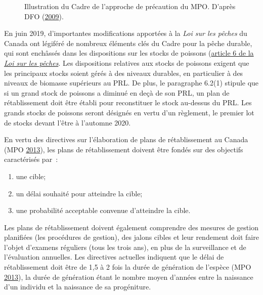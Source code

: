 \documentclass[french,11pt]{book}
\begin{document}
\begin{figure}[htb]

{\centering {} 

}

\caption{Illustration du Cadre de l'approche de précaution du MPO. D'après DFO (\protect\hyperlink{ref-dfo2009}{2009}).}\label{fig:pa-illustration}
\end{figure}
En juin 2019, d'importantes modifications apportées à la \emph{Loi sur les pêches} du Canada ont légiféré de nombreux éléments clés du Cadre pour la pêche durable, qui sont enchâssés dans les dispositions sur les stocks de poissons (\href{https://laws-lois.justice.gc.ca/fra/lois/f-14/page-3.html\#h-1175547}{article 6 de la \emph{Loi sur les pêches}}. Les dispositions relatives aux stocks de poissons exigent que les principaux stocks soient gérés à des niveaux durables, en particulier à des niveaux de biomasse supérieurs au PRL. De plus, le paragraphe 6.2(1) stipule que si un grand stock de poissons a diminué en deçà de son PRL, un plan de rétablissement doit être établi pour reconstituer le stock au-dessus du PRL. Les grands stocks de poissons seront désignés en vertu d'un règlement, le premier lot de stocks devant l'être à l'automne 2020.

En vertu des directives sur l'élaboration de plans de rétablissement au Canada (MPO \protect\hyperlink{ref-dfo2013}{2013}), les plans de rétablissement doivent être fondés sur des objectifs caractérisés par~:
\begin{enumerate}
\def\labelenumi{\arabic{enumi}.}

\item
  une cible;
\item
  un délai souhaité pour atteindre la cible;
\item
  une probabilité acceptable convenue d'atteindre la cible.
\end{enumerate}
Les plans de rétablissement doivent également comprendre des mesures de gestion planifiées (les procédures de gestion), des jalons cibles et leur rendement doit faire l'objet d'examens réguliers (tous les trois ans), en plus de la surveillance et de l'évaluation annuelles. Les directives actuelles indiquent que le délai de rétablissement doit être de 1,5 à 2 fois la durée de génération de l'espèce (MPO \protect\hyperlink{ref-dfo2013}{2013}), la durée de génération étant le nombre moyen d'années entre la naissance d'un individu et la naissance de sa progéniture.
\end{document}
